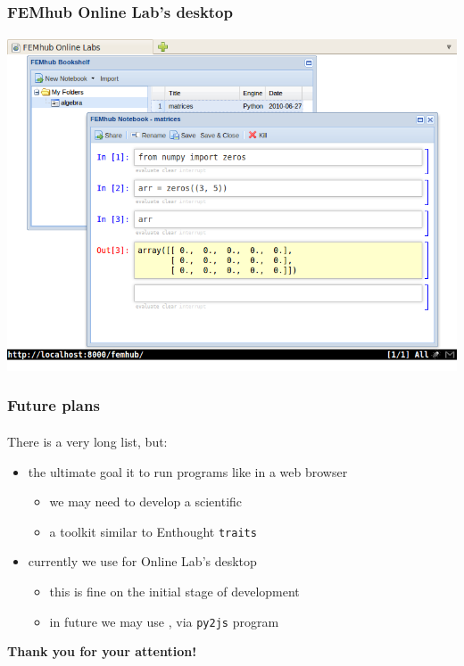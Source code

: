 \documentclass{beamer}
\begin{document}
\begin{frame}
    \frametitle{FEMhub Online Lab's desktop}
    \framesubtitle{}

    \begin{center}
        \includegraphics[scale=0.45]{images/femhub-online-lab.png}
    \end{center}
\end{frame}

\begin{frame}
    \frametitle{Future plans}
    \framesubtitle{}

    There is a very long  list, but:
    \begin{itemize}
        \pause
        \item the ultimate goal it to run programs like  in a web browser
            \begin{itemize}
                \pause
                \item we may need to develop a scientific 
                \pause
                \item a toolkit similar to Enthought \texttt{traits}
            \end{itemize}
        \pause
        \item currently we use  for Online Lab's desktop
            \begin{itemize}
                \pause
                \item this is fine on the initial stage of development
                \pause
                \item in future we may use , via \texttt{py2js} program
            \end{itemize}
    \end{itemize}
\end{frame}

\begin{frame}[plain]
    \begin{center}
        \textbf{Thank you for your attention!}
    \end{center}
\end{frame}
\end{document}
